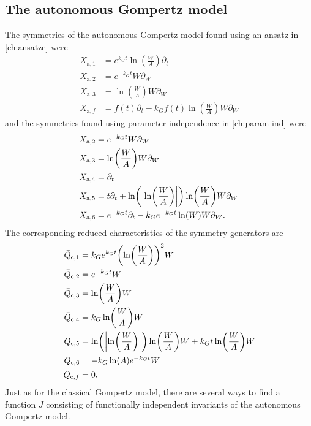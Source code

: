 \subsection{The autonomous Gompertz model}

The symmetries of the autonomous Gompertz model found using an ansatz in \cref{ch:ansatze} were
\begin{align*}
  X_{\text{a},1} &= e^{k_G t} \ln\left(\frac{W}{A}\right) \partial_t \\
  X_{\text{a},2} &= e^{-k_G t} W \partial_W \\
  X_{\text{a},3} &= \ln\left(\frac{W}{A}\right) W \partial_W \\
  X_{\text{a},f} &= f(t) \partial_t - k_G f(t) \ln\left(\frac{W}{A}\right) W \partial_W
\end{align*}
and the symmetries found using parameter independence in \cref{ch:param-ind} were
\begin{align*}
  X_{\text{a},2} &= e^{-k_G t} W \partial_W \\
  X_{\text{a},3} &= \ln\left(\frac{W}{A}\right) W \partial_W \\
  X_{\text{a},4} &= \partial_t \\
  X_{\text{a},5} &= t \partial_t + \ln\left(\abs{\ln\left(\frac{W}{A}\right)}\right) \ln\left(\frac{W}{A}\right) W \partial_W \\
  X_{\text{a},6} &= e^{-k_G t} \partial_t - k_G e^{-k_G t} \ln\mathopen{}\left(W\right)\mathclose{} W \partial_W.
\end{align*}
The corresponding reduced characteristics of the symmetry generators are
\begin{align*}
  \bar{Q}_{\text{c},1} &= k_G e^{k_G t} \left(\ln\left(\frac{W}{A}\right)\right)^2 W \\
  \bar{Q}_{\text{c},2} &= e^{-k_G t} W \\
  \bar{Q}_{\text{c},3} &= \ln\left(\frac{W}{A}\right) W\\
  \bar{Q}_{\text{c},4} &= k_G \ln\left(\frac{W}{A}\right) W \\
  \bar{Q}_{\text{c},5} &= \ln\left(\abs{\ln\left(\frac{W}{A}\right)}\right) \ln\left(\frac{W}{A}\right) W + k_G t \ln\left(\frac{W}{A}\right) W \\
  \bar{Q}_{\text{c},6} &= - k_G \ln\left(A\right) e^{-k_G t} W \\
  \bar{Q}_{\text{c},f} &= 0.
\end{align*}
Just as for the classical Gompertz model, there are several ways to find a function \(J\) consisting of functionally independent invariants of the autonomous Gompertz model.
